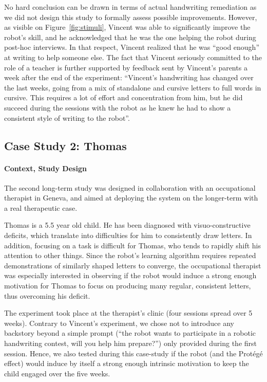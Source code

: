 \documentclass{article}
\begin{document}
No hard conclusion can be drawn in terms of actual handwriting remediation as we
did not design this study to formally assess possible improvements. However, as
visible on Figure~\ref{fig:stimuli}, Vincent was able to significantly improve
the robot's skill, and  he acknowledged that he was the one helping the robot
during post-hoc interviews. In that respect, Vincent realized that he was ``good
enough'' at writing to help someone else. The fact that Vincent seriously
committed to the role of a teacher is further supported by feedback sent by
Vincent's parents a week after the end of the experiment: ``Vincent's
handwriting has changed over the last weeks, going from a mix of standalone and
cursive letters to full words in cursive. This requires a lot of effort and
concentration from him, but he did succeed during the sessions with the robot as
he knew he had to show a consistent style of writing to the robot''.


\subsection{Case Study 2: Thomas}

\paragraph{Context, Study Design}

The second long-term study was designed in collaboration with an occupational
therapist in Geneva, and aimed at deploying the system on the longer-term with a
real therapeutic case.

Thomas is a 5.5 year old child. He has been diagnosed with visuo-constructive
deficits, which translate into difficulties for him to consistently draw
letters. In addition, focusing on a task is difficult for Thomas, who tends to
rapidly shift his attention to other things. Since the robot's learning
algorithm requires repeated demonstrations of similarly shaped letters to
converge, the occupational therapist was especially interested in observing if
the robot would induce a strong enough motivation for Thomas to focus on
producing many regular, consistent letters, thus overcoming his deficit.

The experiment took place at the therapist's clinic (four sessions spread
over 5 weeks). Contrary to Vincent's experiment, we chose not to introduce any
backstory beyond a simple prompt (``the robot wants to participate in a robotic
handwriting contest, will you help him prepare?'') only provided during the
first session. Hence, we also tested during this case-study if the robot (and
the Protégé effect) would induce by itself a strong enough intrinsic motivation
to keep the child engaged over the five weeks.
\end{document}
